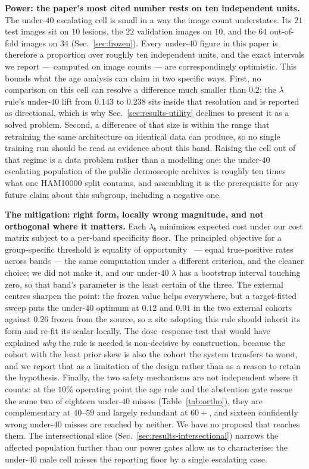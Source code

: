 \documentclass[journal]{IEEEtran}
\begin{document}
\textbf{Power: the paper's most cited number rests on ten independent units.} The under-$40$
escalating cell is small in a way the image count understates. Its $21$ test images sit on
$10$ lesions, the $22$ validation images on $10$, and the $64$ out-of-fold images on $34$
(Sec.~\ref{sec:frozen}). Every under-$40$ figure in this paper is therefore a proportion over
roughly ten independent units, and the exact intervals we report --- computed on image counts
--- are correspondingly optimistic. This bounds what the age analysis can claim in two
specific ways. First, no comparison on this cell can resolve a difference much smaller than
$0.2$; the $\lambda$ rule's under-$40$ lift from $0.143$ to $0.238$ sits inside that
resolution and is reported as directional, which is why Sec.~\ref{sec:results-utility}
declines to present it as a solved problem. Second, a difference of that size is within the
range that retraining the same architecture on identical data can produce, so no single
training run should be read as evidence about this band. Raising the cell out of that regime
is a data problem rather than a modelling one: the under-$40$ escalating population of the
public dermoscopic archives is roughly ten times what one HAM10000 split contains, and
assembling it is the prerequisite for any future claim about this subgroup, including a
negative one.

\textbf{The mitigation: right form, locally wrong magnitude, and not orthogonal where it
matters.} Each $\lambda_b$ minimises expected cost under our cost matrix subject to a
per-band specificity floor. The principled objective for a group-specific threshold is
equality of opportunity~\cite{hardt2016equality} --- equal true-positive rates across bands
--- the same computation under a different criterion, and the cleaner choice; we did not make
it, and our under-$40$ $\lambda$ has a bootstrap interval touching zero, so that band's
parameter is the least certain of the three. The external centres sharpen the point: the
frozen value helps everywhere, but a target-fitted sweep puts the under-$40$ optimum at
$0.12$ and $0.91$ in the two external cohorts against $0.26$ frozen from the source, so a
site adopting this rule should inherit its form and re-fit its scalar locally. The
dose--response test that would have explained \emph{why} the rule is needed is non-decisive
by construction, because the cohort with the least prior skew is also the cohort the system
transfers to worst, and we report that as a limitation of the design rather than as a reason
to retain the hypothesis. Finally, the two safety mechanisms are not independent where it
counts: at the $10\%$ operating point the age rule and the abstention gate rescue the same two
of eighteen under-$40$ misses (Table~\ref{tab:ortho}), they are complementary at $40$--$59$
and largely redundant at $60+$, and sixteen confidently wrong under-$40$ misses are reached by
neither. We have no proposal that reaches them. The intersectional slice
(Sec.~\ref{sec:results-intersectional}) narrows the affected population further than our power
gates allow us to characterise: the under-$40$ male cell misses the reporting floor by a
single escalating case.
\end{document}
